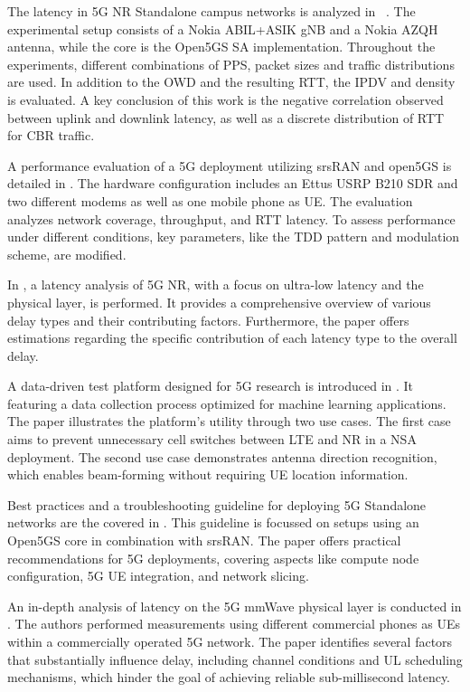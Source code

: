 The latency in 5G NR Standalone campus networks is analyzed in ~\cite{Rischke2022EmpiricalSO}.
The experimental setup consists of a Nokia ABIL+ASIK gNB and a Nokia AZQH antenna, while the core is the Open5GS SA implementation.
Throughout the experiments, different combinations of \gls{PPS}, packet sizes and traffic distributions are used.
In addition to the \gls{OWD} and the resulting \gls{RTT}, the \gls{IPDV} and density is evaluated.
A key conclusion of this work is the negative correlation observed between uplink and downlink latency, as well as a
discrete distribution of \gls{RTT} for \gls{CBR} traffic.

A performance evaluation of a 5G deployment utilizing srsRAN and open5GS is detailed in \cite{10439170}.
The hardware configuration includes an Ettus USRP B210 \gls{SDR} and two different modems as well as one mobile phone as \gls{UE}.
The evaluation analyzes network coverage, throughput, and \gls{RTT} latency.
To assess performance under different conditions, key parameters, like the \gls{TDD} pattern and modulation scheme, are modified.

In \cite{Zhao2023PhysicalLR}, a latency analysis of 5G NR, with a focus on ultra-low latency and the physical layer, is performed.
It provides a comprehensive overview of various delay types and their contributing factors.
Furthermore, the paper offers estimations regarding the specific contribution of each latency type to the overall delay.

A data-driven test platform designed for 5G research is introduced in \cite{Wang2021DevelopmentOA}.
It featuring a data collection process optimized for machine learning applications.
The paper illustrates the platform's utility through two use cases.
The first case aims to prevent unnecessary cell switches between LTE and NR in a \gls{NSA} deployment.
The second use case demonstrates antenna direction recognition, which enables beam-forming without requiring UE
location information.

Best practices and a troubleshooting guideline for deploying 5G Standalone networks are the covered in
\cite{Mamushiane2023DeployingAS}.
This guideline is focussed on setups using an Open5GS core in combination with srsRAN.
The paper offers practical recommendations for 5G deployments, covering aspects like compute node configuration,
5G UE integration, and network slicing.

An in-depth analysis of latency on the 5G mmWave physical layer is conducted in \cite{fezeu2023depth}.
The authors performed measurements using different commercial phones as UEs within a commercially operated 5G network.
The paper identifies several factors that substantially influence delay,
including channel conditions and UL scheduling mechanisms,
which hinder the goal of achieving reliable sub-millisecond latency.


